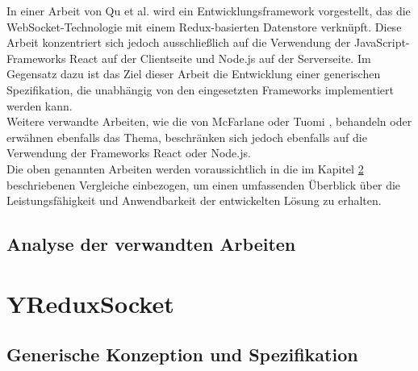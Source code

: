 \documentclass[12pt]{book}          %
\begin{document}
In einer Arbeit von Qu et al. \cite{qu_websocket-based_2019} wird ein Entwicklungsframework vorgestellt, das die WebSocket-Technologie mit einem Redux-basierten Datenstore verknüpft. Diese Arbeit konzentriert sich jedoch ausschließlich auf die Verwendung der JavaScript-Frameworks React auf der Clientseite und Node.js auf der Serverseite. Im Gegensatz dazu ist das Ziel dieser Arbeit die Entwicklung einer generischen Spezifikation, die unabhängig von den eingesetzten Frameworks implementiert werden kann. \\

Weitere verwandte Arbeiten, wie die von McFarlane \cite{mcfarlane_managing_2019} oder Tuomi \cite{tuomi_automated_2018}, behandeln oder erwähnen ebenfalls das Thema, beschränken sich jedoch ebenfalls auf die Verwendung der Frameworks React oder Node.js. \\

Die oben genannten Arbeiten werden voraussichtlich in die im Kapitel \ref{chap-y-redux-socket} beschriebenen Vergleiche einbezogen, um einen umfassenden Überblick über die Leistungsfähigkeit und Anwendbarkeit der entwickelten Lösung zu erhalten.

\section{Analyse der verwandten Arbeiten}
\label{analyse-der-verwandten-arbeiten}

\chapter{YReduxSocket}
\label{chap-y-redux-socket}

\section{Generische Konzeption und Spezifikation}
\label{sec-generische-konzeption-und-spezifikation}
\end{document}
